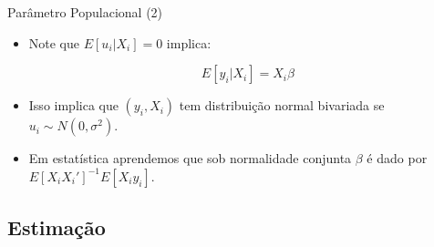 \documentclass[10pt,slides,xcolor=pdftex,dvipsnames,table]{beamer}
\begin{document}

\begin{frame}{Parâmetro Populacional (2)}

\begin{itemize}\itemsep1.2em
    
    \item Note que $E[u_i |X_i ] = 0$ implica:
	
	$$ E [ y_i | X_i] = X_i \beta $$       
    
    \item Isso implica que $(y_i,X_i)$ tem distribuição normal bivariada se $u_i \sim N(0, \sigma^2)$.
	
	\item Em estatística aprendemos que sob normalidade conjunta $\beta$ é dado por $E[X_i X_i']^{-1} E[X_i y_i]$.
        
\end{itemize}

\end{frame}


\subsection{Estimação}
    
    
\end{document}
